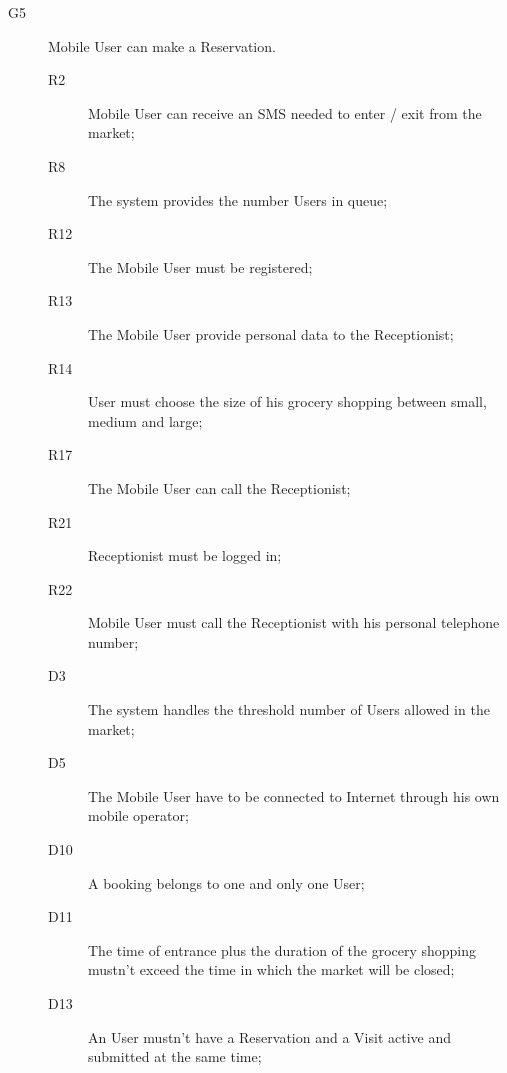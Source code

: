 \begin{description}
    \item[G5]Mobile User can make a Reservation.
    \begin{description}
    \item[R2] Mobile User can receive an SMS needed to enter / exit from the market;   %
    \item[R8] The system provides the number Users in queue; %
    \item[R12] The Mobile User must be registered; %
    \item[R13] The Mobile User provide personal data to the Receptionist; %
    \item[R14] User must choose the size of his grocery shopping between small, medium and large;
    \item[R17] The Mobile User can call the Receptionist; 
    \item[R21] Receptionist must be logged in;
    \item[R22] Mobile User must call the Receptionist with his personal telephone number;
    \item[D3] The system handles the threshold number of Users allowed in the market;
    \item[D5] The Mobile User have to be connected to Internet through his own mobile operator;
    \item[D10] A booking belongs to one and only one User;
    \item[D11] The time of entrance plus the duration of the grocery shopping mustn’t exceed the time in which the market will be closed; 
    \item[D13] An User mustn’t have a Reservation and a Visit active and submitted at the same time;     
    \end{description}
    

\end{description}

